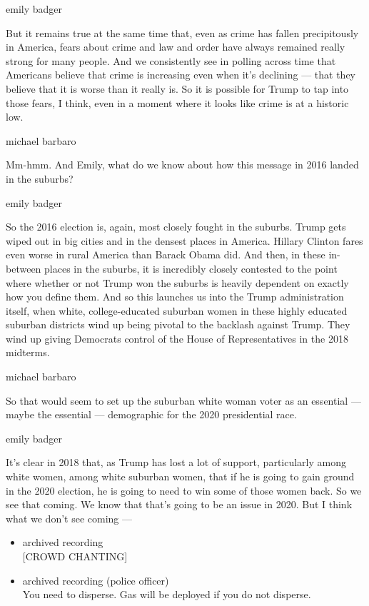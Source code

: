 emily badger

But it remains true at the same time that, even as crime has fallen
precipitously in America, fears about crime and law and order have
always remained really strong for many people. And we consistently see
in polling across time that Americans believe that crime is increasing
even when it's declining --- that they believe that it is worse than it
really is. So it is possible for Trump to tap into those fears, I think,
even in a moment where it looks like crime is at a historic low.

michael barbaro

Mm-hmm. And Emily, what do we know about how this message in 2016 landed
in the suburbs?

emily badger

So the 2016 election is, again, most closely fought in the suburbs.
Trump gets wiped out in big cities and in the densest places in America.
Hillary Clinton fares even worse in rural America than Barack Obama did.
And then, in these in-between places in the suburbs, it is incredibly
closely contested to the point where whether or not Trump won the
suburbs is heavily dependent on exactly how you define them. And so this
launches us into the Trump administration itself, when white,
college-educated suburban women in these highly educated suburban
districts wind up being pivotal to the backlash against Trump. They wind
up giving Democrats control of the House of Representatives in the 2018
midterms.

michael barbaro

So that would seem to set up the suburban white woman voter as an
essential --- maybe the essential --- demographic for the 2020
presidential race.

emily badger

It's clear in 2018 that, as Trump has lost a lot of support,
particularly among white women, among white suburban women, that if he
is going to gain ground in the 2020 election, he is going to need to win
some of those women back. So we see that coming. We know that that's
going to be an issue in 2020. But I think what we don't see coming ---

\begin{itemize}
\item
  archived recording\\
  {[}CROWD CHANTING{]}
\item
  archived recording (police officer)\\
  You need to disperse. Gas will be deployed if you do not disperse.
\end{itemize}

